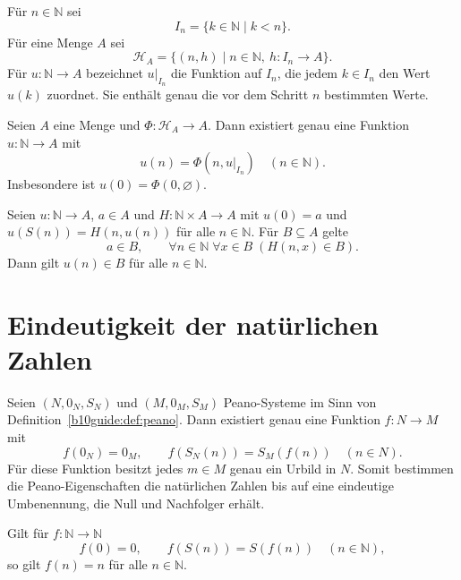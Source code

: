 \begin{definition}
\label{b10guide:def:recursion-history}
Für $n\in\mathbb N$ sei
\[
 I_n=\{k\in\mathbb N\mid k<n\}.
\]
Für eine Menge $A$ sei
\[
 \mathcal H_A=\{(n,h)\mid n\in\mathbb N,\ h\colon I_n\to A\}.
\]
Für $u\colon\mathbb N\to A$ bezeichnet $u|_{I_n}$ die Funktion
auf $I_n$, die jedem $k\in I_n$ den Wert $u(k)$ zuordnet.
Sie enthält genau die vor dem Schritt $n$ bestimmten Werte.
\end{definition}

\begin{theorem}
\label{b10guide:thm:history-recursion}
Seien $A$ eine Menge und $\Phi\colon\mathcal H_A\to A$.
Dann existiert genau eine Funktion $u\colon\mathbb N\to A$ mit
\[
 u(n)=\Phi(n,u|_{I_n})\quad(n\in\mathbb N).
\]
Insbesondere ist $u(0)=\Phi(0,\varnothing)$.
\end{theorem}

\begin{theorem}
\label{b10guide:thm:recursion-invariant}
Seien $u\colon\mathbb N\to A$, $a\in A$ und
$H\colon\mathbb N\times A\to A$ mit
$u(0)=a$ und $u(S(n))=H(n,u(n))$ für alle $n\in\mathbb N$.
Für $B\subseteq A$ gelte
\[
 a\in B,\qquad
 \forall n\in\mathbb N\;\forall x\in B\;(H(n,x)\in B).
\]
Dann gilt $u(n)\in B$ für alle $n\in\mathbb N$.
\end{theorem}

\section{Eindeutigkeit der natürlichen Zahlen}

\begin{theorem}
\label{b10guide:thm:categoricity}
Seien $(N,0_N,S_N)$ und $(M,0_M,S_M)$ Peano-Systeme im Sinn
von Definition~\ref{b10guide:def:peano}.
Dann existiert genau eine Funktion $f\colon N\to M$ mit
\[
 f(0_N)=0_M,\qquad f(S_N(n))=S_M(f(n))\quad(n\in N).
\]
Für diese Funktion besitzt jedes $m\in M$ genau ein Urbild in $N$.
Somit bestimmen die Peano-Eigenschaften die natürlichen Zahlen bis
auf eine eindeutige Umbenennung, die Null und Nachfolger erhält.
\end{theorem}

\begin{theorem}
\label{b10guide:thm:rigidity}
Gilt für $f\colon\mathbb N\to\mathbb N$
\[
 f(0)=0,\qquad f(S(n))=S(f(n))\quad(n\in\mathbb N),
\]
so gilt $f(n)=n$ für alle $n\in\mathbb N$.
\end{theorem}

